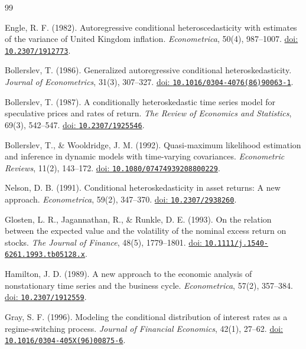 \documentclass[12pt,a4paper]{article}
\numberwithin{equation}{section}
\begin{document}
\clearpage
\begin{thebibliography}{99}

Engle, R. F. (1982).
Autoregressive conditional heteroscedasticity with estimates of the variance of United Kingdom inflation.
\textit{Econometrica}, 50(4), 987--1007.
\href{https://doi.org/10.2307/1912773}{doi: \nolinkurl{10.2307/1912773}}.

Bollerslev, T. (1986).
Generalized autoregressive conditional heteroskedasticity.
\textit{Journal of Econometrics}, 31(3), 307--327.
\href{https://doi.org/10.1016/0304-4076(86)90063-1}{doi: \nolinkurl{10.1016/0304-4076(86)90063-1}}.

Bollerslev, T. (1987).
A conditionally heteroskedastic time series model for speculative prices and rates of return.
\textit{The Review of Economics and Statistics}, 69(3), 542--547.
\href{https://doi.org/10.2307/1925546}{doi: \nolinkurl{10.2307/1925546}}.

Bollerslev, T., \& Wooldridge, J. M. (1992).
Quasi-maximum likelihood estimation and inference in dynamic models with time-varying covariances.
\textit{Econometric Reviews}, 11(2), 143--172.
\href{https://doi.org/10.1080/07474939208800229}{doi: \nolinkurl{10.1080/07474939208800229}}.

Nelson, D. B. (1991).
Conditional heteroskedasticity in asset returns: A new approach.
\textit{Econometrica}, 59(2), 347--370.
\href{https://doi.org/10.2307/2938260}{doi: \nolinkurl{10.2307/2938260}}.

Glosten, L. R., Jagannathan, R., \& Runkle, D. E. (1993).
On the relation between the expected value and the volatility of the nominal excess return on stocks.
\textit{The Journal of Finance}, 48(5), 1779--1801.
\href{https://doi.org/10.1111/j.1540-6261.1993.tb05128.x}{doi: \nolinkurl{10.1111/j.1540-6261.1993.tb05128.x}}.

Hamilton, J. D. (1989).
A new approach to the economic analysis of nonstationary time series and the business cycle.
\textit{Econometrica}, 57(2), 357--384.
\href{https://doi.org/10.2307/1912559}{doi: \nolinkurl{10.2307/1912559}}.

Gray, S. F. (1996).
Modeling the conditional distribution of interest rates as a regime-switching process.
\textit{Journal of Financial Economics}, 42(1), 27--62.
\href{https://doi.org/10.1016/0304-405X(96)00875-6}{doi: \nolinkurl{10.1016/0304-405X(96)00875-6}}.


\end{thebibliography}
\end{document}
